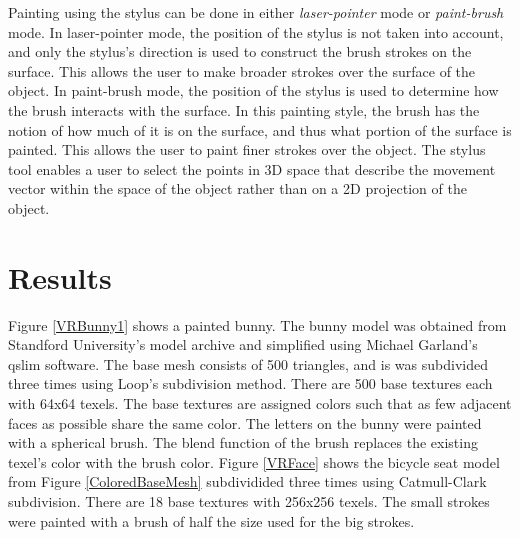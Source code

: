 \documentclass[10pt,twocolumn]{article}
\begin{document}
Painting using the stylus can be done in either {\em laser-pointer} mode or
{\em paint-brush} mode. 
In laser-pointer mode, the position of the stylus 
is not taken into account, and only the stylus's direction is used to 
construct the brush strokes on the surface. 
This allows the user to make broader strokes over the surface of the object.
In paint-brush mode, the position of the stylus is used to determine 
how the brush interacts with the surface. 
In this painting style, the
brush has the notion of how much of it is on the surface, and thus what portion of the
surface is painted.
This allows the user to paint finer strokes over the object. 
The stylus tool enables a user to select the points in 3D space that describe the movement
vector within the space of the object rather than on a 2D projection of the object.

\section{Results}
\indent Figure \ref{VRBunny1} shows a painted bunny. The bunny model
was obtained from Standford University's model archive and simplified
using Michael Garland's qslim software. 
The base mesh consists of 500 triangles, and is was 
subdivided three times using Loop's subdivision method.
There are 500 base textures each with 64x64 texels. 
The base textures are assigned colors such that as few adjacent faces as 
possible share the same color.
The letters on the bunny were painted with a spherical brush.
The blend function of the brush replaces the existing texel's color with the brush color.
Figure \ref{VRFace} shows the bicycle seat model from Figure \ref{ColoredBaseMesh}
subdividided three times using Catmull-Clark subdivision.
There are 18 base textures with 256x256 texels. The small strokes 
were painted with a brush of half the size used for the big strokes.
 
\end{document}
